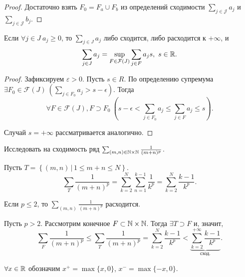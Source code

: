 \begin{proof}
    Достаточно взять $F_{0} = F_{a} \cup F_{b}$ из определений сходимости $\sum_{j \in \mathcal{J}} a_{j}$ и $\sum_{j \in \mathcal{J}} b_{j}$.
\end{proof}

\begin{property}
    Если $\forall j \in J \ a_j \ge 0$, то $\sum_{j \in J} a_j$ либо сходится, либо расходится к $+\infty$, и
    \[
        \sum_{j \in J} a_j = \sup_{F \in \mathcal{F}(J)} \sum_{j \in F} a_j s, \ s \in \mathbb{R}.
    \]

    \begin{proof}
        Зафиксируем $\varepsilon > 0$.
        Пусть $s \in R$. По определению супремума $\exists F_0 \in \mathcal{F}(J) \ \left(\sum_{j \in F_0} a_j > s - \epsilon\right)$.  Тогда
        \[
            \forall F \in \mathcal{F}(J), F \supset F_0 \ \left(s - \epsilon < \sum_{j \in F_0} a_j \le \sum_{j \in F} a_j \le s\right).
        \]

        Случай $s = +\infty$ рассматривается аналогично.
    \end{proof}
\end{property}

\begin{example}
    Исследовать на сходимость ряд $\sum_{(m, n) \in \mathbb{N} \times \mathbb{N}} \frac{1}{(m + n)^p}$.
\end{example}

\begin{solution}
    Пусть $T = \left\{(m, n) \,|\, 1 \le m + n \le N\right\}$.
    \[
        \sum_T \frac{1}{(m + n)^p} = \sum_{k = 2}^N \sum_{n = 1}^{k - 1} \frac{1}{k^p} = \sum_{k = 2}^N \frac{k - 1}{k^p}.
    \]

    Если $p \le 2$, то $\sum_{(m, n)} \frac{1}{(m + n)^p}$ расходится.

    Пусть $p > 2$. Рассмотрим конечное $F \subset \mathbb{N} \times \mathbb{N}$. Тогда $\exists T \supset F$ и, значит,
    \[
        \sum_F \frac{1}{(m + n)^p} \le \sum_T \frac{1}{(m + n)^p} = \sum_{k = 2}^N \frac{k - 1}{k^p} < \underbrace{\sum_{k = 2}^{+\infty} \frac{k - 1}{k^p}}_{\text{сход.}}.
    \]
\end{solution}

\begin{definition}
    $\forall x \in \mathbb{R}$ обозначим $x^+ = \max\{x, 0\}$, $x^- = \max\{-x, 0\}$.
\end{definition}

